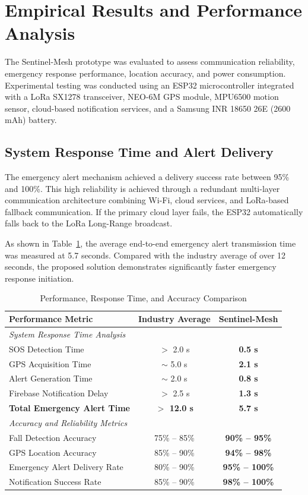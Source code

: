 \documentclass[11pt, a4paper]{article}
\begin{document}
\section{Empirical Results and Performance Analysis}

The Sentinel-Mesh prototype was evaluated to assess communication reliability, emergency response performance, location accuracy, and power consumption. Experimental testing was conducted using an ESP32 microcontroller integrated with a LoRa SX1278 transceiver, NEO-6M GPS module, MPU6500 motion sensor, cloud-based notification services, and a Samsung INR 18650 26E (2600 mAh) battery.

\subsection{System Response Time and Alert Delivery}

The emergency alert mechanism achieved a delivery success rate between 95\% and 100\%. This high reliability is achieved through a redundant multi-layer communication architecture combining Wi-Fi, cloud services, and LoRa-based fallback communication. If the primary cloud layer fails, the ESP32 automatically falls back to the LoRa Long-Range broadcast.

As shown in Table~\ref{tab:performance_stats}, the average end-to-end emergency alert transmission time was measured at 5.7 seconds. Compared with the industry average of over 12 seconds, the proposed solution demonstrates significantly faster emergency response initiation.

\begin{table}[hbt!]
\centering
\caption{Performance, Response Time, and Accuracy Comparison}
\label{tab:performance_stats}
\renewcommand{\arraystretch}{1.3}
\begin{tabular}{@{}lcc@{}}
\toprule
\textbf{Performance Metric} & \textbf{Industry Average} & \textbf{Sentinel-Mesh} \\ \midrule
\multicolumn{3}{l}{\textit{System Response Time Analysis}} \\
SOS Detection Time & $>$ 2.0 s & \textbf{0.5 s} \\
GPS Acquisition Time & $\sim$ 5.0 s & \textbf{2.1 s} \\
Alert Generation Time & $\sim$ 2.0 s & \textbf{0.8 s} \\
Firebase Notification Delay & $>$ 2.5 s & \textbf{1.3 s} \\
\textbf{Total Emergency Alert Time} & \textbf{$>$ 12.0 s} & \textbf{5.7 s} \\ \midrule
\multicolumn{3}{l}{\textit{Accuracy and Reliability Metrics}} \\
Fall Detection Accuracy & 75\% -- 85\% & \textbf{90\% -- 95\%} \\
GPS Location Accuracy & 85\% -- 90\% & \textbf{94\% -- 98\%} \\
Emergency Alert Delivery Rate & 80\% -- 90\% & \textbf{95\% -- 100\%} \\
Notification Success Rate & 85\% -- 90\% & \textbf{98\% -- 100\%} \\ \bottomrule
\end{tabular}
\end{table}
\end{document}
